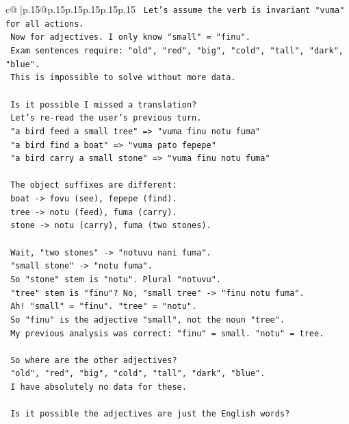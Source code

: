 \documentclass{article}
\begin{document}
{\begin{supertabular}{c@{$\;$}|p{.15\linewidth}@{}p{.15\linewidth}p{.15\linewidth}p{.15\linewidth}p{.15\linewidth}p{.15\linewidth}}
{{{\texttt{    Let's assume the verb is invariant "vuma" for all actions.} \\
\texttt{    Now for adjectives. I only know "small" = "finu".} \\
\texttt{    Exam sentences require: "old", "red", "big", "cold", "tall", "dark", "blue".} \\
\texttt{    This is impossible to solve without more data.} \\
\\ 
\texttt{    Is it possible I missed a translation?} \\
\texttt{    Let's re{-}read the user's previous turn.} \\
\texttt{    "a bird feed a small tree" => "vuma finu notu fuma"} \\
\texttt{    "a bird find a boat" => "vuma pato fepepe"} \\
\texttt{    "a bird carry a small stone" => "vuma finu notu fuma"} \\
\\ 
\texttt{    The object suffixes are different:} \\
\texttt{    boat {-}> fovu (see), fepepe (find).} \\
\texttt{    tree {-}> notu (feed), fuma (carry).} \\
\texttt{    stone {-}> notu (carry), fuma (two stones).} \\
\\ 
\texttt{    Wait, "two stones" {-}> "notuvu nani fuma".} \\
\texttt{    "small stone" {-}> "notu fuma".} \\
\texttt{    So "stone" stem is "notu". Plural "notuvu".} \\
\texttt{    "tree" stem is "finu"? No, "small tree" {-}> "finu notu fuma".} \\
\texttt{    Ah! "small" = "finu". "tree" = "notu".} \\
\texttt{    So "finu" is the adjective "small", not the noun "tree".} \\
\texttt{    My previous analysis was correct: "finu" = small. "notu" = tree.} \\
\\ 
\texttt{    So where are the other adjectives?} \\
\texttt{    "old", "red", "big", "cold", "tall", "dark", "blue".} \\
\texttt{    I have absolutely no data for these.} \\
\\ 
\texttt{    Is it possible the adjectives are just the English words?} \\
}}}
\end{supertabular}}
\end{document}
